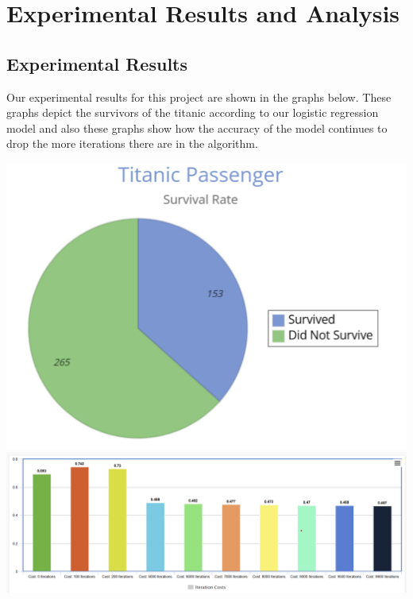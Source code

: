 \documentclass{IEEE}
\begin{document}
\section{Experimental Results and Analysis}

\subsection{Experimental Results}
Our experimental results for this project are shown in the graphs below. These graphs depict the survivors of the titanic according to our logistic regression model and also these graphs show how the accuracy of the model continues to drop the more iterations there are in the algorithm.

\includegraphics[scale=0.535]{./piechart.png}
\\ \includegraphics[scale=0.32]{./barchart.png}
\end{document}
